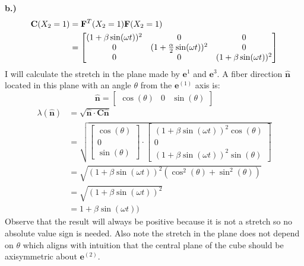 \textbf{b.)}
\begin{align*}
    \mathbf{C}(X_2 = 1) &= \mathbf{F}^T(X_2 = 1) \mathbf{F}(X_2 = 1) \\
    &= \begin{bmatrix}
        (1+\beta\sin(\omega t))^2 & 0 & 0 \\ 
        0 & (1 + \frac{\alpha}{2}\sin(\omega t))^2 & 0 \\
        0 & 0 & (1 + \beta \sin(\omega t))^2
    \end{bmatrix}
\end{align*}
I will calculate the stretch in the plane made by $\mathbf{e}^{1}$ and $\mathbf{e}^{3}$. A fiber direction $\mathbf{\hat{n}}$ located in this plane with an angle $\theta$ from the $\mathbf{e}^(1)$ axis is: 
\begin{equation*}
\mathbf{\hat{n}} = \begin{bmatrix} \cos(\theta) & 0 & \sin(\theta) \end{bmatrix}
\end{equation*}
\begin{align*}
\lambda(\mathbf{\hat{n}}) &= \sqrt{\mathbf{\hat{n}} \cdot \mathbf{C} \mathbf{\hat{n}}} \\
&= \sqrt{ \begin{bmatrix} \cos(\theta) \\ 0 \\ \sin(\theta) \end{bmatrix} \cdot \begin{bmatrix}
    (1+\beta\sin(\omega t))^2\cos(\theta) \\ 0 \\ (1 + \beta\sin(\omega t))^2\sin(\theta)
\end{bmatrix}} \\
&= \sqrt{(1+\beta\sin(\omega t))^2(\cos^2(\theta) + \sin^2(\theta))} \\ 
&= \sqrt{(1+\beta\sin(\omega t))^2} \\
&= 1+\beta\sin(\omega t))
\end{align*}
Observe that the result will always be positive because it is not a stretch so no absolute value sign is needed. Also note the stretch in the plane does not depend on $\theta$ which aligns with intuition that the central plane of the cube should be axisymmetric about $\mathbf{e}^{(2)}$. 

